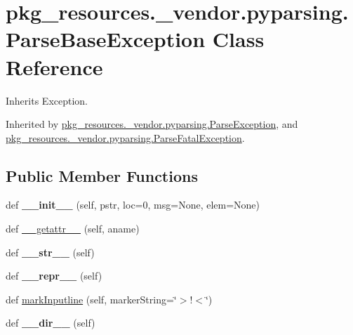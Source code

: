 \hypertarget{classpkg__resources_1_1__vendor_1_1pyparsing_1_1_parse_base_exception}{}\section{pkg\+\_\+resources.\+\_\+vendor.\+pyparsing.\+Parse\+Base\+Exception Class Reference}
\label{classpkg__resources_1_1__vendor_1_1pyparsing_1_1_parse_base_exception}


Inherits Exception.



Inherited by \hyperlink{classpkg__resources_1_1__vendor_1_1pyparsing_1_1_parse_exception}{pkg\+\_\+resources.\+\_\+vendor.\+pyparsing.\+Parse\+Exception}, and \hyperlink{classpkg__resources_1_1__vendor_1_1pyparsing_1_1_parse_fatal_exception}{pkg\+\_\+resources.\+\_\+vendor.\+pyparsing.\+Parse\+Fatal\+Exception}.

\subsection*{Public Member Functions}
\begin{DoxyCompactItemize}
\item 
\mbox{\label{classpkg__resources_1_1__vendor_1_1pyparsing_1_1_parse_base_exception_a2d2736624c72154529dab65673d38f64}} 
def {\bfseries \+\_\+\+\_\+init\+\_\+\+\_\+} (self, pstr, loc=0, msg=None, elem=None)
\item 
def \hyperlink{classpkg__resources_1_1__vendor_1_1pyparsing_1_1_parse_base_exception_a073d1851d3a9bdf3c596c9266267e883}{\+\_\+\+\_\+getattr\+\_\+\+\_\+} (self, aname)
\item 
\mbox{\label{classpkg__resources_1_1__vendor_1_1pyparsing_1_1_parse_base_exception_aeac6131975ea071bb1568632199c88c0}} 
def {\bfseries \+\_\+\+\_\+str\+\_\+\+\_\+} (self)
\item 
\mbox{\label{classpkg__resources_1_1__vendor_1_1pyparsing_1_1_parse_base_exception_afe576f309a840f461d64f110856f3eab}} 
def {\bfseries \+\_\+\+\_\+repr\+\_\+\+\_\+} (self)
\item 
def \hyperlink{classpkg__resources_1_1__vendor_1_1pyparsing_1_1_parse_base_exception_a6c4c8cd6caa4b1b7630557b453e89911}{mark\+Inputline} (self, marker\+String=\char`\"{}$>$!$<$\char`\"{})
\item 
\mbox{\label{classpkg__resources_1_1__vendor_1_1pyparsing_1_1_parse_base_exception_a2af892e2d865fead301a03c406cae851}} 
def {\bfseries \+\_\+\+\_\+dir\+\_\+\+\_\+} (self)
\end{DoxyCompactItemize}
